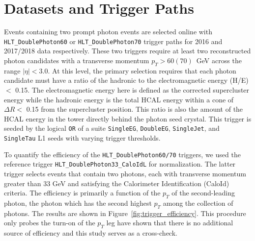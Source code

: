 \chapter{Datasets and Trigger Paths}\label{ch:appendix_datasets_triggerpaths}
\RaggedRight \parindent=25pt
Events containing two prompt photon events are selected online with \texttt{HLT\_DoublePhoton60} or \texttt{HLT\_DoublePhoton70} trigger paths for 2016 and 2017/2018 data respectively. These two triggers require at least two reconstructed photon candidates with a transverse momentum $p_{T} > 60 (70)$~GeV across the range $|\eta| < 3.0$. At this level, the primary selection requires that each photon candidate must have a ratio of the hadronic to the electromagnetic energy (H/E) $<$ 0.15. The electromagnetic energy here is defined as the corrected supercluster energy while the hadronic energy is the total HCAL energy within a cone of $\Delta R <$  0.15 from the supercluster position. This ratio is also the amount of the HCAL energy in the tower directly behind the photon seed crystal. This trigger is seeded by the logical \texttt{OR} of a suite \texttt{SingleEG}, \texttt{DoubleEG}, \texttt{SingleJet}, and \texttt{SingleTau} L1 seeds with varying trigger thresholds. 


To quantify the efficiency of the \texttt{HLT\_DoublePhoton60/70} triggers, we used the reference trigger \texttt{HLT\_DoublePhoton33\_CaloIdL} for normalization. The latter trigger selects events that contain two photons, each with transverse momentum greater than 33 GeV and satisfying the Calorimeter Identification (CaloId) criteria. The efficiency is primarily a function of the $p_{T}$ of the second-leading photon, the photon which has the second highest $p_{T}$ among the collection of photons. The results are shown in Figure~\ref{fig:trigger_efficiency}. This procedure only probes the turn-on of the $p_{T}$ leg \cite{ref:AN2016_167} have shown that there is no additional source of efficiency and this study serves as a cross-check. 

